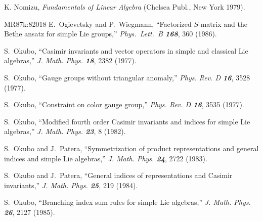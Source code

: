  K. Nomizu, %
    {\em Fundamentals of Linear Algebra}
    (Chelsea Publ., New York 1979).



        {MR87k:82018}
E.~Ogievetsky and P.~Wiegmann,
``Factorized $S$-matrix and the Bethe
  ansatz for simple Lie groups,''
{\em Phys.~Lett.~B  \bf 168}, 360 (1986). %

S.~Okubo,
``Casimir invariants and vector operators in simple
and classical Lie algebras,''
{\em J. Math. Phys. \bf 18}, 2382 (1977). %

S.~Okubo,
``Gauge groups without triangular anomaly,''
{\em Phys.  Rev.    D \bf 16}, 3528 (1977).

S.~Okubo,
``Constraint on color gauge group,''
{\em Phys. Rev. D \bf 16}, 3535 (1977).


S.~Okubo,
``Modified fourth order Casimir invariants and indices for simple Lie algebras,''
{\em J.  Math.  Phys.    \bf 23}, 8 (1982).

S.~Okubo and J.~Patera,
``Symmetrization of product representations and general indices and simple
Lie algebras,''
{\em J.  Math.  Phys.    \bf 24}, 2722 (1983).

S.~Okubo and J.~Patera,
``General indices of representations and Casimir invariants,''
{\em J.  Math.  Phys.    \bf 25}, 219 (1984).

S.~Okubo,
``Branching index sum rules for simple Lie algebras,''
{\em J. Math. Phys.  \bf 26}, 2127 (1985).

